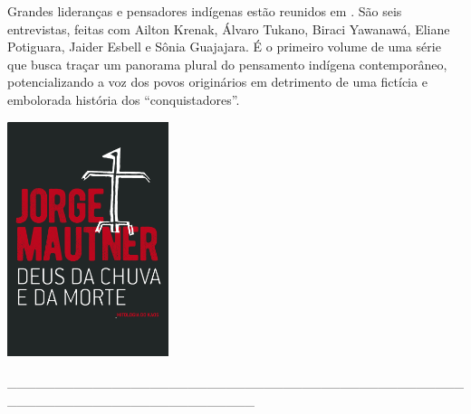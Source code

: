 \medskip

\noindent{}Grandes lideranças e pensadores indígenas estão reunidos em {}. São seis entrevistas, feitas com Ailton Krenak, Álvaro Tukano, Biraci Yawanawá, Eliane Potiguara, Jaider Esbell e Sônia Guajajara. É o primeiro volume de uma série que busca traçar um panorama plural do pensamento indígena contemporâneo, potencializando a voz dos povos originários em detrimento de uma fictícia e embolorada história dos “conquistadores”.

\vfill

\hspace*{-.4cm}\begin{minipage}[c]{0.90\linewidth}
\small{
{}}
\end{minipage}


\pagebreak

\hspace{.5cm}

\begin{center}
\hspace*{-.5cm}\includegraphics[width=47mm]{./imgs/mautner.jpg}
\end{center}

\hspace*{-2cm}\_\_\_\_\_\_\_\_\_\_\_\_\_\_\_\_\_\_\_\_\_\_\_\_\_\_\_\_\_\_\_\_\_\_\_\_\_\_\_\_\_\_\_\_\_\_\_\_\_\_\_\_\_\_\_\_\_\_\_\_\_\_\_\_\_\_\_\_\_\_\_\_\_\_


